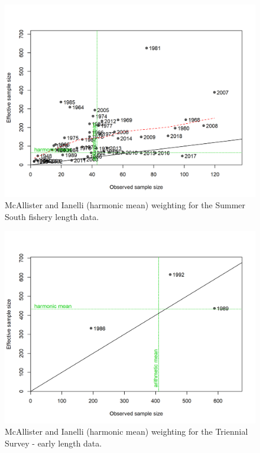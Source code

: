 \documentclass[12pt,]{article}
\begin{document}
\FloatBarrier

\begin{figure}
\centering
\includegraphics{r4ss/plots_mod1/comp_lenfit_sampsize_flt4mkt2.png}
\caption{McAllister and Ianelli (harmonic mean) weighting for the Summer
South fishery length data. \label{fig:harm_mean_wn}}
\end{figure}

\FloatBarrier

\begin{figure}
\centering
\includegraphics{r4ss/plots_mod1/comp_lenfit_sampsize_flt5mkt0.png}
\caption{McAllister and Ianelli (harmonic mean) weighting for the
Triennial Survey - early length data. \label{fig:harm_mean_tri_early}}
\end{figure}
\end{document}
